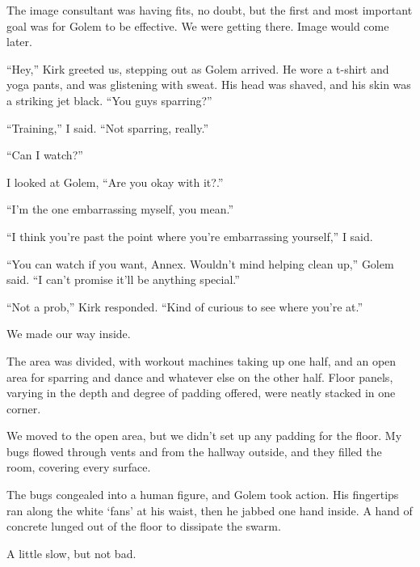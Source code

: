 The image consultant was having fits, no doubt, but the first and most important goal was for Golem to be effective.  We were getting there.  Image would come later.



``Hey,'' Kirk greeted us, stepping out as Golem arrived.  He wore a t-shirt and yoga pants, and was glistening with sweat.  His head was shaved, and his skin was a striking jet black.  ``You guys sparring?''



``Training,'' I said.  ``Not sparring, really.''



``Can I watch?''



I looked at Golem, ``Are you okay with it?.''



``I'm the one embarrassing myself, you mean.''



``I think you're past the point where you're embarrassing yourself,'' I said.



``You can watch if you want, Annex.  Wouldn't mind helping clean up,'' Golem said. ``I can't promise it'll be anything special.''



``Not a prob,'' Kirk responded.  ``Kind of curious to see where you're at.''



We made our way inside.



The area was divided, with workout machines taking up one half, and an open area for sparring and dance and whatever else on the other half.  Floor panels, varying in the depth and degree of padding offered, were neatly stacked in one corner.



We moved to the open area, but we didn't set up any padding for the floor.  My bugs flowed through vents and from the hallway outside, and they filled the room, covering every surface.



The bugs congealed into a human figure, and Golem took action.  His fingertips ran along the white `fans' at his waist, then he jabbed one hand inside.  A hand of concrete lunged out of the floor to dissipate the swarm.



A little slow, but not bad.



